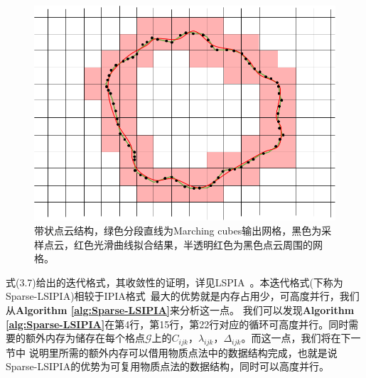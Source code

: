 \begin{figure}[htbp]
    \centering
    \includegraphics[scale=0.60]{./images/SparseDataStructure.png}
    \caption[稀疏数据结构]{带状点云结构，绿色分段直线为Marching cubes输出网格，黑色为采样点云，红色光滑曲线拟合结果，半透明红色为黑色点云周围的网格。}
    \label{fig: SparseSparse-LSIPIA}
\end{figure}

式(3.7)给出的迭代格式，其收敛性的证明，详见LSPIA~\cite{lin2018convergence}。本迭代格式(下称为Sparse-LSIPIA)相较于IPIA格式~\cite{hamza2020implicit}最大的优势就是内存占用少，可高度并行，我们从\textbf{Algorithm \ref{alg:Sparse-LSIPIA}}来分析这一点。
我们可以发现\textbf{Algorithm \ref{alg:Sparse-LSIPIA}}在第4行，第15行，第22行对应的循环可高度并行。同时需要的额外内存为储存在每个格点$\mathcal{G}$上的$C_{ijk}$，$\lambda_{ijk}$，$\Delta_{ijk}$。而这一点，我们将在下一节中
说明里所需的额外内存可以借用物质点法中的数据结构完成，也就是说Sparse-LSIPIA的优势为可复用物质点法的数据结构，同时可以高度并行。

